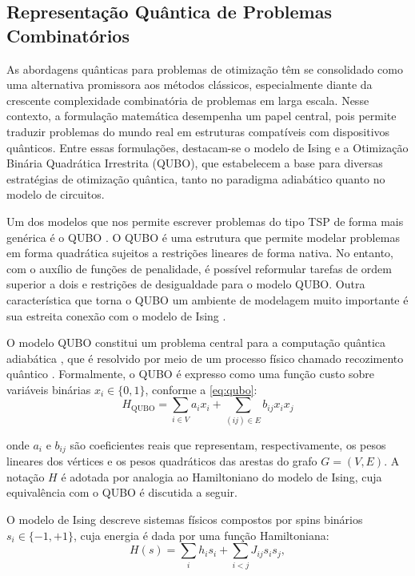\subsection{Representação Quântica de Problemas Combinatórios}
\label{sec:quantum_representation}

As abordagens quânticas para problemas de otimização têm se consolidado como uma alternativa promissora aos métodos clássicos, especialmente diante da crescente complexidade combinatória de problemas em larga escala. Nesse contexto, a formulação matemática desempenha um papel central, pois permite traduzir problemas do mundo real em estruturas compatíveis com dispositivos quânticos. Entre essas formulações, destacam-se o modelo de Ising e a Otimização Binária Quadrática Irrestrita (QUBO), que estabelecem a base para diversas estratégias de otimização quântica, tanto no paradigma adiabático quanto no modelo de circuitos.

Um dos modelos que nos permite escrever problemas do tipo TSP de forma mais genérica é o QUBO \cite{lewis2017quadratic}. O QUBO é uma estrutura que permite modelar problemas em forma quadrática sujeitos a restrições lineares de forma nativa. No entanto, com o auxílio de funções de penalidade, é possível reformular tarefas de ordem superior a dois e restrições de desigualdade para o modelo QUBO. Outra característica que torna o QUBO um ambiente de modelagem muito importante é sua estreita conexão com o modelo de Ising \cite{cipra1987introduction}.

O modelo QUBO constitui um problema central para a computação quântica adiabática \cite{mcgeoch2013experimental}, que é resolvido por meio de um processo físico chamado recozimento quântico \cite{mcgeoch2022adiabatic, brooke1999quantum}. Formalmente, o QUBO é expresso como uma função custo sobre variáveis binárias $x_i \in \{0,1\}$, conforme a \autoref{eq:qubo}:
\begin{equation}
    \label{eq:qubo}
    H_{\text{QUBO}}=\sum_{i\in V}a_ix_i+\sum_{(ij)\in E}b_{ij}x_ix_j
\end{equation}

\noindent onde $a_i$ e $b_{ij}$ são coeficientes reais que representam, respectivamente, os pesos lineares dos vértices e os pesos quadráticos das arestas do grafo $G = (V, E)$. A notação $H$ é adotada por analogia ao Hamiltoniano do modelo de Ising, cuja equivalência com o QUBO é discutida a seguir.

O modelo de Ising descreve sistemas físicos compostos por spins binários $s_i \in \{-1, +1\}$, cuja energia é dada por uma função Hamiltoniana:
\begin{equation}
    \label{eq:ising_hamiltonian}
    H(s) = \sum_i h_i s_i + \sum_{i<j} J_{ij} s_i s_j,
\end{equation}

